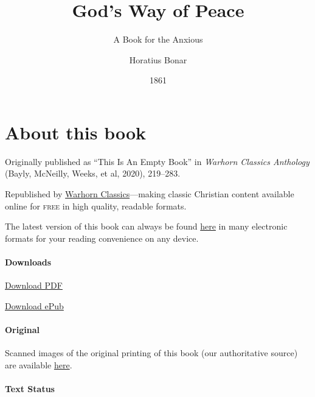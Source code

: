 \documentclass[
]{book}
\title{God's Way of Peace}
\subtitle{A Book for the Anxious}
\author{Horatius Bonar}
\date{1861}
\begin{document}
\maketitle

\mainmatter
{}

{
\setcounter{tocdepth}{1}
\tableofcontents
}
\hypertarget{about-this-book}{%
\chapter*{About this book}\label{about-this-book}}

Originally published as ``This Is An Empty Book'' in \emph{Warhorn Classics Anthology} (Bayly, McNeilly, Weeks, et al, 2020), 219--283.

Republished by \href{https://classics.warhornmedia.com/}{Warhorn Classics}---making classic Christian content available online for \textsc{free} in high quality, readable formats.

The latest version of this book can always be found \href{https://warhornmedia.github.io/bonar-peace/}{here} in many electronic formats for your reading convenience on any device.

\hypertarget{downloads}{%
\subsubsection*{Downloads}\label{downloads}}

\href{https://warhornmedia.github.io/bonar-peace//Bonar-Peace.pdf}{Download PDF}

\href{https://warhornmedia.github.io/bonar-peace//Bonar-Peace.epub}{Download ePub}

\hypertarget{original}{%
\subsubsection*{Original}\label{original}}

Scanned images of the original printing of this book (our authoritative source) are available \href{https://archive.org/details/godswayofpeacebo00bona/page/n5/mode/2up}{here}.

\hypertarget{text-status}{%
\subsubsection*{Text Status}\label{text-status}}
\end{document}
